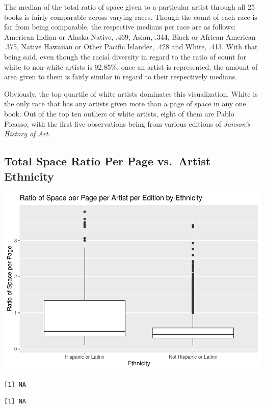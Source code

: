 \documentclass[
  letterpaper,
  DIV=11,
  numbers=noendperiod]{scrreprt}
\begin{document}
The median of the total ratio of space given to a particular artist
through all 25 books is fairly comparable across varying races. Though
the count of each race is far from being comparable, the respective
medians per race are as follows: American Indian or Alaska Native, .469,
Asian, .344, Black or African American .375, Native Hawaiian or Other
Pacific Islander, .428 and White, .413. With that being said, even
though the racial diversity in regard to the ratio of count for white to
non-white artists is 92.85\%, once an artist is represented, the amount
of area given to them is fairly similar in regard to their respectively
medians.

Obviously, the top quartile of white artists dominates this
visualization. White is the only race that has any artists given more
than a page of space in any one book. Out of the top ten outliers of
white artists, eight of them are Pablo Picasso, with the first five
observations being from various editions of \emph{Janson's History of
Art.}

\hypertarget{total-space-ratio-per-page-vs.-artist-ethnicity}{%
\subsection{Total Space Ratio Per Page vs.~Artist
Ethnicity}\label{total-space-ratio-per-page-vs.-artist-ethnicity}}

\includegraphics{Chapter1/Chapter1_files/figure-pdf/ethnicityallbooks-1.pdf}

\begin{verbatim}
[1] NA
\end{verbatim}

\begin{verbatim}
[1] NA
\end{verbatim}
\end{document}

